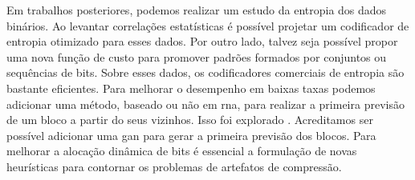 Em trabalhos posteriores, podemos realizar um estudo da entropia dos dados binários. Ao levantar correlações estatísticas é possível projetar um codificador de entropia otimizado para esses dados. 
Por outro lado, talvez seja possível propor uma nova função de custo para promover padrões formados por conjuntos ou sequências de bits. Sobre esses dados, os codificadores comerciais de entropia são bastante eficientes.
Para melhorar o desempenho em baixas taxas podemos adicionar uma método, baseado ou não em \acrshort{rna}, para realizar a primeira previsão de um bloco a partir do seus vizinhos. Isso foi explorado \cite{SpatiallyAdaptive2018Minnen}. Acreditamos ser possível adicionar uma \acrshort{gan} para gerar a primeira previsão dos blocos.
Para melhorar a alocação dinâmica de bits é essencial a formulação de novas heurísticas para contornar os problemas de artefatos de compressão.  


